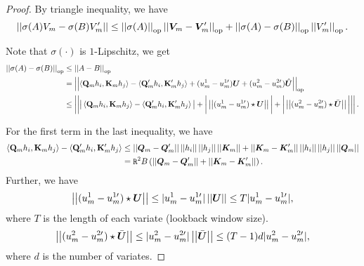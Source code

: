 \begin{proof}
    By triangle inequality, we have
    \[
    \norm{
    \sigma(A) V_m - \sigma(B) V_m^\prime
    }
    \leq 
    \norm{\sigma(A)}_{\text{op}}
    \norm{\bV_m - \bV_m^\prime}_{\text{op}}
    +
    \norm{\sigma(A) - \sigma(B)}_{\text{op}}
    \norm{V^\prime_m}_{\text{op}}.
    \]

    Note that $\sigma(\cdot)$ is $1$-Lipschitz, we get
    \begin{align*}
        \norm{\sigma(A) - \sigma(B)}_{\text{op}}
        &\leq
        \norm{A-B}_{\text{op}}
        \\
        &=
        \norm{
        \Braket{ \Qb_m h_i, \Kb_m h_j } 
        -
        \Braket{ \Qb_m^\prime h_i, \Kb_m^\prime h_j }
        +
        ( u^1_m - u_m^{1\prime} ) \bU
        +
        ( u^2_m - u_m^{2 \prime} ) \hat{\bU}
        }_{\text{op}}
        \\
        &\leq
        \norm{
        \big\vert
            \Braket{ \Qb_m h_i, \Kb_m h_j } 
        -
        \Braket{ \Qb_m^\prime h_i, \Kb_m^\prime h_j }
        \big\vert
        +
        \bigg\vert
        \norm{
        ( u^1_m - u_m^{1\prime} ) \star \bU
        }
        \bigg\vert
        +
        \bigg\vert
        \norm{
        ( u^2_m - u_m^{2 \prime} ) \star \bar{\bU}
        }
        \bigg\vert
        }
        .
    \end{align*}

    For the first term in the last inequality, we have
    \begin{align*}
    \Braket{ \Qb_m h_i, \Kb_m h_j } 
        -
    \Braket{ \Qb_m^\prime h_i, \Kb_m^\prime h_j }
    &\leq
    \norm{
    \bQ_m - \bQ_m^\prime
    }
    \norm{h_i}
    \norm{h_j}
    \norm{\bK_m}
    +
    \norm{
    \bK_m - \bK_m^\prime
    }
    \norm{h_i}
    \norm{h_j}
    \norm{\bQ_m}
    \\
    &=
    \mathtt{R}^2 B
    \left(
    \norm{
    \bQ_m - \bQ_m^\prime
    }
    +
    \norm{
    \bK_m - \bK_m^\prime
    }
    \right).
    \end{align*}
    Further, we have
    \[
    \norm{ (u^1_m - u_m^{1\prime}) \star \bU }
    \leq
    \vert 
    u^1_m - u_m^{1\prime}
    \vert 
    \norm{\bU}
    \leq
    T    \vert 
    u^1_m - u_m^{1\prime}
    \vert ,
    \]
    where $T$ is the length of each variate (lookback window size).
    \[
    \norm{ (u^2_m - u_m^{2 \prime}) \star \bar{\bU} }
    \leq
    \vert 
    u^2_m - u_m^{2 \prime}
    \vert 
    \norm{\bar{\bU}}
    \leq
    (T-1)d
    \vert 
    u^2_m - u_m^{2 \prime}
    \vert 
    ,
    \]
    where $d$ is the number of variates.
    

\end{proof}
